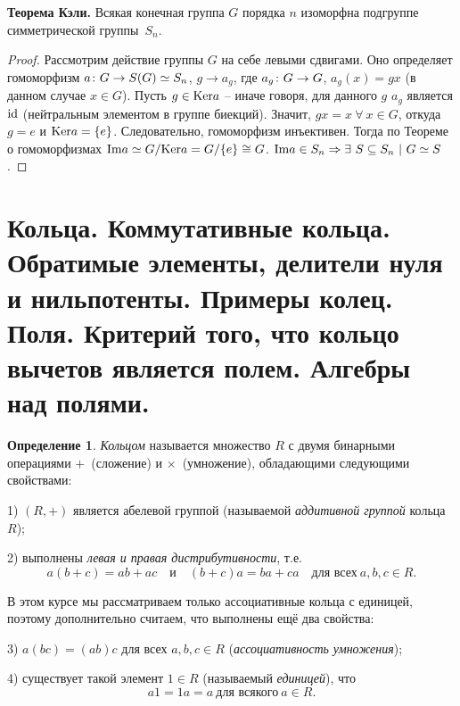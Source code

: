 \documentclass[a4paper, 12pt]{article}
\def\Ker{{\rm Ker}}%
\def\Im{{\rm Im}}%
\def\id{{\rm id}}%
\def\id{{\rm id}}
\theoremstyle{definition}
\newtheorem{definition}{Определение}
\theoremstyle{remark}
\begin{document}
\smallskip

{\bf Теорема Кэли.} Всякая конечная группа $G$ порядка $n$ изоморфна
подгруппе симметрической группы~$S_n$.

\begin{proof}
Рассмотрим действие группы $G$ на себе левыми сдвигами. Оно определяет гомоморфизм $a \colon G \to S(G) \simeq\nobreak S_n$, $g \to a_g$, где $a_g \colon G \to\nobreak G$, $a_g(x) = gx$ (в данном случае $x \in G$). Пусть $g \in \Ker a$ -- иначе говоря, для данного $g$ $a_g$ является $\id$ (нейтральным элементом в группе биекций). Значит, $gx = x\ \forall\ x \in G$, откуда $g = e$ и $\Ker a = \lbrace e \rbrace$. Следовательно, гомоморфизм инъективен. Тогда по Теореме о гомоморфизмах $\Im a \simeq G/\Ker a = G / \lbrace e \rbrace \cong G$. $\Im a \in S_n \Rightarrow \exists\ S \subseteq S_n\ |\ G \simeq S$.
\end{proof}

\section{Кольца. Коммутативные кольца. Обратимые элементы, делители нуля и нильпотенты. Примеры колец. Поля. Критерий того, что кольцо вычетов является полем. Алгебры над полями.}

\begin{definition}
{\it Кольцом} называется множество $R$ с двумя бинарными операциями
\guillemotleft $+$\guillemotright{}~(сложение) и \guillemotleft
$\times$\guillemotright{}~(умножение), обладающими следующими
свойствами:

1) $(R,+)$ является абелевой группой (называемой {\it аддитивной
группой} кольца $R$);

2) выполнены {\it левая и правая дистрибутивности}, т.е.
$$
a(b+c)=ab+ac \quad \text{и} \quad (b+c)a=ba+ca \quad \text{для всех}
\ a,b,c\in R.
$$

В этом курсе мы рассматриваем только ассоциативные кольца с
единицей, поэтому дополнительно считаем, что выполнены ещё два
свойства:

3) $a(bc)=(ab)c$ для всех $a,b,c\in R$ (\textit{ассоциативность
умножения});

4) существует такой элемент $1\in R$ (называемый \textit{единицей}),
что
\begin{equation} \label{eq1}
a1 = 1a = a \ \text{для всякого} \ a \in R.
\end{equation}
\end{definition}
\end{document}
